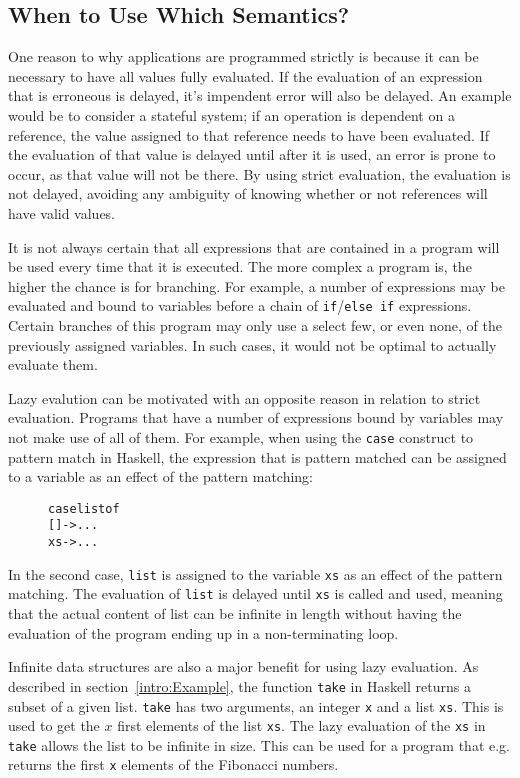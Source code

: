 \subsection{When to Use Which Semantics?}
One reason to why applications are programmed strictly is because it can be
necessary to have all values fully evaluated. If the evaluation of an expression
that is erroneous is delayed, it's impendent error will also be delayed.
An example would be to consider a stateful system; if an operation is dependent
on a reference, the value assigned to that reference needs to have been
evaluated. If the evaluation of that value is delayed until after it is used,
an error is prone to occur, as that value will not be there.
By using strict evaluation, the evaluation is not delayed, avoiding any
ambiguity of knowing whether or not references will have valid values.

It is not always certain that all expressions that are contained in a program
will be used every time that it is executed. The more complex a program is, the
higher the chance is for branching. For example, a number of expressions may
be evaluated and bound to variables before a chain of
\texttt{if}/\texttt{else if} expressions. Certain branches of this program may
only use a select few, or even none, of the previously assigned variables.
In such cases, it would not be optimal to actually evaluate them.

Lazy evalution can be motivated with an opposite reason in relation to strict
evaluation. Programs that have a number of expressions bound by variables may
not make use of all of them. For example, when using the \texttt{case} construct
to pattern match in Haskell, the expression that is pattern matched can be
assigned to a variable as an effect of the pattern matching:

\begin{figure}[H]
\begin{alltt}
  case list of
    [] -> ...
    xs -> ...
\end{alltt}
\end{figure}

\noindent In the second case, \texttt{list} is assigned to the variable
\texttt{xs} as an effect of the pattern matching. The evaluation of
\texttt{list} is delayed until \texttt{xs} is called and used, meaning
that the actual content of list can be infinite in length without having the
evaluation of the program ending up in a non-terminating loop.

Infinite data structures are also a major benefit for using lazy evaluation.
As described in section~\ref{intro:Example}, the function \texttt{take}
in Haskell returns a subset of a given list. \texttt{take} has two arguments,
an integer \texttt{x} and a list \texttt{xs}. This is used to get the
$x$ first elements of the list \texttt{xs}. The lazy evaluation of the
\texttt{xs} in \texttt{take} allows the list to be infinite in size. This
can be used for a program that e.g. returns the first \texttt{x} elements of
the Fibonacci numbers.


